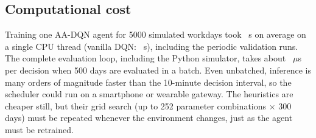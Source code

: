 \subsection{Computational cost}\label{sec:cost}
Training one AA-DQN agent for 5000 simulated workdays took \trainTimeAA{}~s on average on a single CPU thread (vanilla DQN: \trainTimeDQN{}~s), including the periodic validation runs.  The complete evaluation loop, including the Python simulator, takes about \inferUs{}~$\mu$s per decision when 500 days are evaluated in a batch. Even unbatched, inference is many orders of magnitude faster than the 10-minute decision interval, so the scheduler could run on a smartphone or wearable gateway. The heuristics are cheaper still, but their grid search (up to 252 parameter combinations $\times$ 300 days) must be repeated whenever the environment changes, just as the agent must be retrained.
